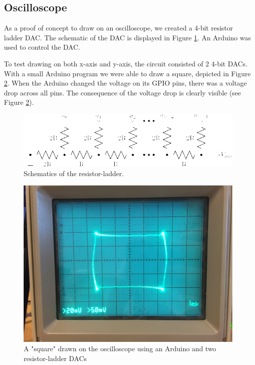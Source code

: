 \subsection{Oscilloscope}
As a proof of concept to draw on an oscilloscope, we created a 4-bit resistor ladder DAC. The schematic of the DAC is displayed in Figure \ref{fig:r2r-ladder}.
An Arduino was used to control the DAC.

To test drawing on both x-axis and y-axis, the circuit consisted of 2 4-bit DACs.
With a small Arduino program we were able to draw a square, depicted in Figure \ref{fig:osc_poc}.
When the Arduino changed the voltage on its GPIO pins, there was a voltage drop across all pins.
The consequence of the voltage drop is clearly visible (see Figure \ref{fig:osc_poc}).


\begin{figure}[h]
\includegraphics[width=\columnwidth]{images/r2r-ladder}
\centering
\caption{Schematics of the resistor-ladder\cite{r2r-ladder-schematics}.}
\label{fig:r2r-ladder}
\end{figure}

\begin{figure}[h]
\includegraphics[width=\columnwidth]{images/osc_square_close}
\centering
\caption{A "square" drawn on the oscilloscope using an Arduino and two resistor-ladder DACs}
\label{fig:osc_poc}
\end{figure}